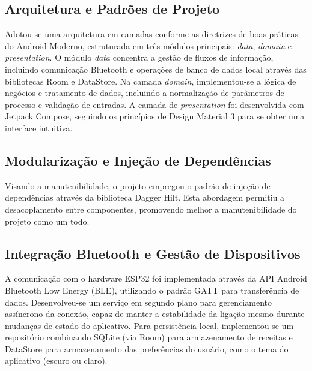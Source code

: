 \subsection{Arquitetura e Padrões de Projeto}

Adotou-se uma arquitetura em camadas conforme as diretrizes de boas práticas do Android Moderno, estruturada em três módulos principais: \textit{data}, \textit{domain} e \textit{presentation}. O módulo \textit{data} concentra a gestão de fluxos de informação, incluindo comunicação Bluetooth e operações de banco de dados local através das bibliotecas Room e DataStore. Na camada \textit{domain}, implementou-se a lógica de negócios e tratamento de dados, incluindo a normalização de parâmetros de processo e validação de entradas. A camada de \textit{presentation} foi desenvolvida com Jetpack Compose, seguindo os princípios de Design Material 3 para se obter uma interface intuitiva.

\subsection{Modularização e Injeção de Dependências}

Visando a manutenibilidade, o projeto empregou o padrão de injeção de dependências através da biblioteca Dagger Hilt. Esta abordagem permitiu a desacoplamento entre componentes, promovendo melhor a manutenibilidade do projeto como um todo. 

\subsection{Integração Bluetooth e Gestão de Dispositivos}

A comunicação com o hardware ESP32 foi implementada através da API Android Bluetooth Low Energy (BLE), utilizando o padrão GATT para transferência de dados. Desenvolveu-se um serviço em segundo plano para gerenciamento assíncrono da conexão, capaz de manter a estabilidade da ligação mesmo durante mudanças de estado do aplicativo. Para persistência local, implementou-se um repositório combinando SQLite (via Room) para armazenamento de receitas e DataStore para armazenamento das preferências do usuário, como o tema do aplicativo (escuro ou claro).



